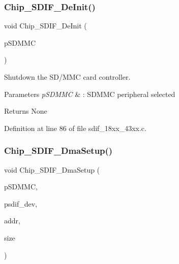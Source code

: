\subsubsection{\texorpdfstring{Chip\+\_\+\+S\+D\+I\+F\+\_\+\+De\+Init()}{Chip\_SDIF\_DeInit()}}
{\footnotesize\ttfamily void Chip\+\_\+\+S\+D\+I\+F\+\_\+\+De\+Init (\begin{DoxyParamCaption}\item[{\hyperlink{struct_l_p_c___s_d_m_m_c___t}{L\+P\+C\+\_\+\+S\+D\+M\+M\+C\+\_\+T} $\ast$}]{p\+S\+D\+M\+MC }\end{DoxyParamCaption})}



Shutdown the S\+D/\+M\+MC card controller. 


\begin{DoxyParams}{Parameters}
{\em p\+S\+D\+M\+MC} & \+: S\+D\+M\+MC peripheral selected \\
\hline
\end{DoxyParams}
\begin{DoxyReturn}{Returns}
None 
\end{DoxyReturn}


Definition at line 86 of file sdif\+\_\+18xx\+\_\+43xx.\+c.

\mbox{\label{group___s_d_i_f__18_x_x__43_x_x_ga0c02401583b78fec76f6366730e1ff5f}} 
\subsubsection{\texorpdfstring{Chip\+\_\+\+S\+D\+I\+F\+\_\+\+Dma\+Setup()}{Chip\_SDIF\_DmaSetup()}}
{\footnotesize\ttfamily void Chip\+\_\+\+S\+D\+I\+F\+\_\+\+Dma\+Setup (\begin{DoxyParamCaption}\item[{\hyperlink{struct_l_p_c___s_d_m_m_c___t}{L\+P\+C\+\_\+\+S\+D\+M\+M\+C\+\_\+T} $\ast$}]{p\+S\+D\+M\+MC,  }\item[{\hyperlink{group___s_d_i_f__18_x_x__43_x_x_ga14a605aa797cde1201ae414437a32292}{sdif\+\_\+device} $\ast$}]{psdif\+\_\+dev,  }\item[{uint32\+\_\+t}]{addr,  }\item[{uint32\+\_\+t}]{size }\end{DoxyParamCaption})}




